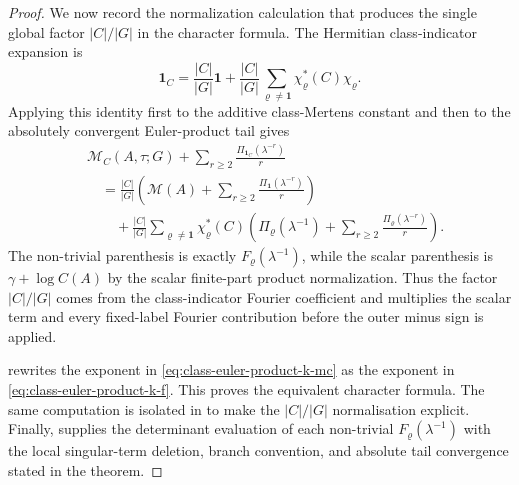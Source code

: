 \documentclass[11pt,a4paper]{amsart}
\theoremstyle{plain}
\theoremstyle{definition}
\theoremstyle{remark}
\begin{document}
\begin{proof}
  We now record the normalization calculation that produces the single
  global factor \(|C|/|G|\) in the character formula.  The Hermitian
  class-indicator expansion is
  \[
    \mathbf1_C
    =
    \frac{|C|}{|G|}\mathbf1+
    \frac{|C|}{|G|}
      \sum_{\varrho\neq\mathbf1}\chi_\varrho^\ast(C)\chi_\varrho .
  \]
  Applying this identity first to the additive class-Mertens constant and
  then to the absolutely convergent Euler-product tail gives
  \[
  \begin{aligned}
    &\mathcal M_C(A,\tau;G)+
      \sum_{r\ge2}\frac{\Pi_{\mathbf1_C}(\lambda^{-r})}{r} \\
    &\quad=
      \frac{|C|}{|G|}
      \left(
        \mathcal M(A)+\sum_{r\ge2}\frac{\Pi_{\mathbf1}(\lambda^{-r})}{r}
      \right) \\
    &\qquad+
      \frac{|C|}{|G|}
      \sum_{\varrho\neq\mathbf1}\chi_\varrho^\ast(C)
      \left(
        \Pi_\varrho(\lambda^{-1})+
        \sum_{r\ge2}\frac{\Pi_\varrho(\lambda^{-r})}{r}
      \right).
  \end{aligned}
  \]
  The non-trivial parenthesis is exactly
  \(F_\varrho(\lambda^{-1})\), while the scalar parenthesis is
  \(\gamma+\log C(A)\) by the scalar finite-part product normalization.
  Thus the factor \(|C|/|G|\) comes from the class-indicator Fourier
  coefficient and multiplies the scalar term and every fixed-label Fourier
  contribution before the outer minus sign is applied.

   rewrites the exponent in
  \eqref{eq:class-euler-product-k-mc} as the exponent in
  \eqref{eq:class-euler-product-k-f}. This proves the equivalent
  character formula.  The same computation is isolated in
    to make the
   \(|C|/|G|\) normalisation explicit.  Finally,
    supplies the determinant
   evaluation of each non-trivial \(F_\varrho(\lambda^{-1})\) with the local
   singular-term deletion, branch convention, and absolute tail convergence
   stated in the theorem.
\end{proof}
\end{document}
